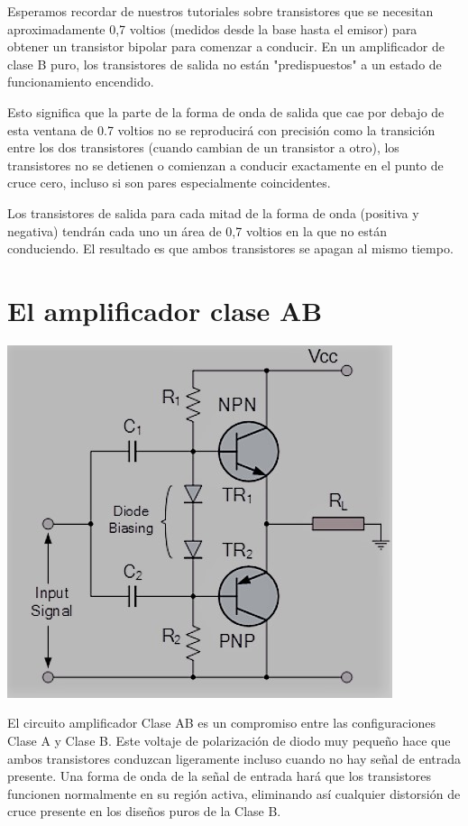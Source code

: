 \documentclass[12pt,a4paper]{article}
\begin{document}
\begin{flushleft}
\begin{flushleft}
Esperamos recordar de nuestros tutoriales sobre transistores que se necesitan aproximadamente 0,7 voltios (medidos desde la base hasta el emisor) para obtener un transistor bipolar para comenzar a conducir. En un amplificador de clase B puro, los transistores de salida no están "predispuestos" a un estado de funcionamiento encendido.\linebreak

Esto significa que la parte de la forma de onda de salida que cae por debajo de esta ventana de 0.7 voltios no se reproducirá con precisión como la transición entre los dos transistores (cuando cambian de un transistor a otro), los transistores no se detienen o comienzan a conducir exactamente en el punto de cruce cero, incluso si son pares especialmente coincidentes.\linebreak

Los transistores de salida para cada mitad de la forma de onda (positiva y negativa) tendrán cada uno un área de 0,7 voltios en la que no están conduciendo. El resultado es que ambos transistores se apagan al mismo tiempo.\linebreak
\section{El amplificador clase AB}
\begin{center}
\includegraphics[scale=0.6]{imagenes/AB.JPG}
\end{center}
El circuito amplificador Clase AB es un compromiso entre las configuraciones Clase A y Clase B. Este voltaje de polarización de diodo muy pequeño hace que ambos transistores conduzcan ligeramente incluso cuando no hay señal de entrada presente. Una forma de onda de la señal de entrada hará que los transistores funcionen normalmente en su región activa, eliminando así cualquier distorsión de cruce presente en los diseños puros de la Clase B.\linebreak


\end{flushleft}
\end{flushleft}
\end{document}
